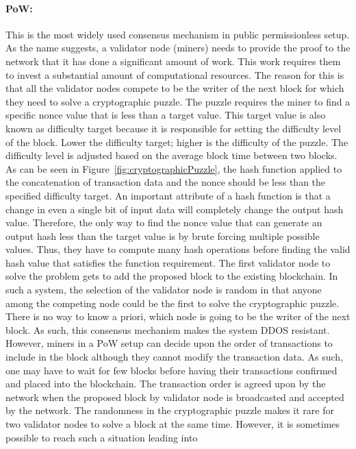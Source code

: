 \paragraph{\ac{PoW}:}This is the most widely used consensus mechanism in public
permissionless setup. As the name suggests, a validator node (miners) needs to
provide the proof to the network that it has done a significant amount of work.
This work requires them to invest a substantial amount of computational
resources. The reason for this is that all the validator nodes compete to be
the writer of the next block for which they need to solve a cryptographic
puzzle. The puzzle requires the miner to find a specific nonce value that is
less than a target value. This target value is also known as difficulty target
because it is responsible for setting the difficulty level of the block. Lower
the difficulty target; higher is the difficulty of the puzzle. The difficulty
level is adjusted based on the average block time between two blocks. As can be
seen in Figure~\ref{fig:cryptographicPuzzle}, the hash function applied to the
concatenation of transaction data and the nonce should be less than the
specified difficulty target. An important attribute of a hash function is that
a change in even a single bit of input data will completely change the output
hash value. Therefore, the only way to find the nonce value that can generate
an output hash less than the target value is by brute forcing multiple possible
values. Thus, they have to compute many hash operations before finding the
valid hash value that satisfies the function requirement. The first validator
node to solve the problem gets to add the proposed block to the existing
blockchain. In such a system, the selection of the validator node is random in
that anyone among the competing node could be the first to solve the
cryptographic puzzle. There is no way to know a priori, which node is going to
be the writer of the next block. As such, this consensus mechanism makes the
system DDOS resistant. However, miners in a \ac{PoW} setup can decide upon the
order of transactions to include in the block although they cannot modify the
transaction data. As such, one may have to wait for few blocks before having
their transactions confirmed and placed into the blockchain. The transaction
order is agreed upon by the network when the proposed block by validator node
is broadcasted and accepted by the network. The randomness in the cryptographic
puzzle makes it rare for two validator nodes to solve a block at the same time.
However, it is sometimes possible to reach such a situation leading into
